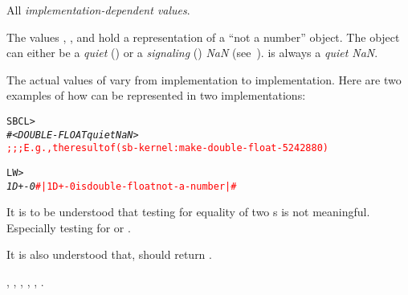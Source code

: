 \documentclass[../Float-Infinities-Nan.tex]{subfiles}
\begin{document}

\DValues{}

All \emph{implementation-dependent values}.


\DDescription{}

The values , , and  hold a
representation of a ``not a number'' object.  The object can either be
a \emph{quiet} () or a \emph{signaling} ()
\emph{NaN} (see~\cite{2008:IEEE-754}).   is always a
\emph{quiet NaN}.


\DExamples{}

The actual values of  vary from implementation to
implementation.  Here are two examples of how  can be
represented in two implementations:

\begin{alltt}
SBCL> 
\textit{#<DOUBLE-FLOAT quiet NaN>}
\textcolor{red}{;;; E.g., the result of (sb-kernel:make-double-float -524288 0)}
\end{alltt}

\begin{alltt}
LW> 
\textit{1D+-0} \textcolor{red}{#| 1D+-0 is double-float not-a-number |#}
\end{alltt}

\DNotes{}

\noindent
It is to be understood that testing for equality of two s is
not meaningful.  Especially testing for  or .

\noindent
It is also understood that,  should return .

\DSeeAlso{}

, , , ,
, .
\end{document}
